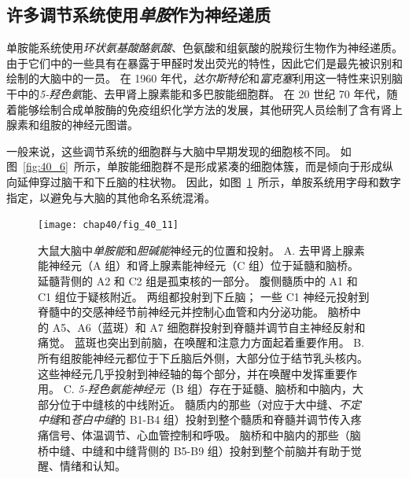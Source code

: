 \subsection{许多调节系统使用\textit{单胺}作为神经递质}

单胺能系统使用\textit{环状氨基酸酪氨酸}、色氨酸和组氨酸的脱羧衍生物作为神经递质。
由于它们中的一些具有在暴露于甲醛时发出荧光的特性，因此它们是最先被识别和绘制的大脑中的一员。
在 1960 年代，\textit{达尔斯特伦}和\textit{富克塞}利用这一特性来识别脑干中的\textit{5-羟色氨}能、去甲肾上腺素能和多巴胺能细胞群。
在 20 世纪 70 年代，随着能够绘制合成单胺酶的免疫组织化学方法的发展，其他研究人员绘制了含有肾上腺素和组胺的神经元图谱。


一般来说，这些调节系统的细胞群与大脑中早期发现的细胞核不同。
如图~\ref{fig:40_6}~所示，单胺能细胞群不是形成紧凑的细胞体簇，而是倾向于形成纵向延伸穿过脑干和下丘脑的柱状物。
因此，如图~\ref{fig:40_11}~所示，单胺系统用字母和数字指定，以避免与大脑的其他命名系统混淆。


\begin{figure}[htbp]
	\centering
	\texttt{[image: chap40/fig\_40\_11]}
	\caption{大鼠大脑中\textit{单胺能}和\textit{胆碱能}神经元的位置和投射。
		A. 去甲肾上腺素能神经元（A 组）和肾上腺素能神经元（C 组）位于延髓和脑桥。
		延髓背侧的 A2 和 C2 组是孤束核的一部分。
		腹侧髓质中的 A1 和 C1 组位于疑核附近。
		两组都投射到下丘脑；
		一些 C1 神经元投射到脊髓中的交感神经节前神经元并控制心血管和内分泌功能。
		脑桥中的 A5、A6（蓝斑）和 A7 细胞群投射到脊髓并调节自主神经反射和痛觉。
		蓝斑也突出到前脑，在唤醒和注意力方面起着重要作用。
		B. 所有组胺能神经元都位于下丘脑后外侧，大部分位于结节乳头核内。
		这些神经元几乎投射到神经轴的每个部分，并在唤醒中发挥重要作用。
		C. \textit{5-羟色氨能神经元}（B 组）存在于延髓、脑桥和中脑内，大部分位于中缝核的中线附近。
		髓质内的那些（对应于大中缝、\textit{不定中缝}和\textit{苍白中缝}的 B1-B4 组）投射到整个髓质和脊髓并调节传入疼痛信号、体温调节、心血管控制和呼吸。
		脑桥和中脑内的那些（脑桥中缝、中缝和中缝背侧的 B5-B9 组）投射到整个前脑并有助于觉醒、情绪和认知。}
	\label{fig:40_11}
\end{figure}


